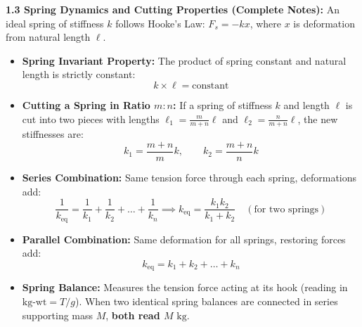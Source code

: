 \documentclass[11pt,a4paper]{article}
\begin{document}
\begin{tcolorbox}[formulacard]
  \textbf{\textcolor{primaryDark}{1.3 Spring Dynamics and Cutting Properties (Complete Notes):}}
  An ideal spring of stiffness $k$ follows Hooke's Law: $F_s = -kx$, where $x$ is deformation from natural length $\ell$.
  \begin{itemize}[leftmargin=14pt,itemsep=2.5pt]
    \item \textbf{Spring Invariant Property:} The product of spring constant and natural length is strictly constant:
    \[
      k \times \ell = \text{constant}
    \]
    \item \textbf{Cutting a Spring in Ratio $m : n$:} If a spring of stiffness $k$ and length $\ell$ is cut into two pieces with lengths $\ell_1 = \frac{m}{m+n}\ell$ and $\ell_2 = \frac{n}{m+n}\ell$, the new stiffnesses are:
    \[
      k_1 = \frac{m+n}{m}k, \qquad k_2 = \frac{m+n}{n}k
    \]
    \item \textbf{Series Combination:} Same tension force through each spring, deformations add:
    \[
      \frac{1}{k_{\text{eq}}} = \frac{1}{k_1} + \frac{1}{k_2} + \dots + \frac{1}{k_n} \implies k_{\text{eq}} = \frac{k_1 k_2}{k_1 + k_2} \quad (\text{for two springs})
    \]
    \item \textbf{Parallel Combination:} Same deformation for all springs, restoring forces add:
    \[
      k_{\text{eq}} = k_1 + k_2 + \dots + k_n
    \]
    \item \textbf{Spring Balance:} Measures the tension force acting at its hook (reading in $\text{kg-wt} = T/g$). When two identical spring balances are connected in series supporting mass $M$, \textbf{both read $M\text{ kg}$}.
  \end{itemize}
\end{tcolorbox}
\end{document}
